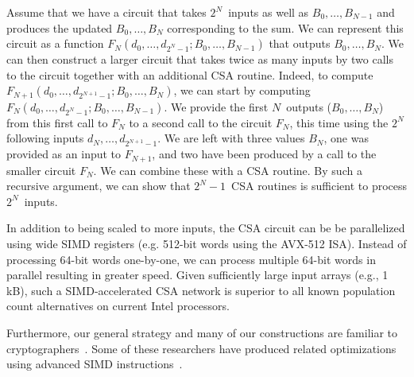 \documentclass[AMA,STIX1COL]{WileyNJD-v2}
\begin{document}
Assume that we have a circuit that takes $2^N$~inputs as well as  $B_0, \ldots, B_{N-1}$ and produces the updated $B_0, \ldots, B_{N}$ corresponding to the sum. We can represent this circuit as a function $F_N (d_0, \ldots, d_{2^N-1}; B_0, \ldots, B_{N-1})$ that outputs  $B_0, \ldots, B_{N}$. We can then construct a larger circuit that takes twice as many inputs by two calls to the circuit together with an additional CSA routine. Indeed, to compute $F_{N+1} (d_0, \ldots, d_{2^{N+1}-1}; B_0, \ldots, B_{N})$, we can start by computing $F_N (d_0, \ldots, d_{2^N-1}; B_0, \ldots, B_{N-1})$. We provide the first $N$~outputs ($B_0, \ldots, B_{N}$) from this first call to $F_N$ to a second call to the circuit $F_N$, this time using the $2^N$ following inputs $d_N, \ldots, d_{2^{N+1}-1}$. We are left with three values $B_N$, one was provided as an input to $F_{N+1}$, and two have been produced by a call to the smaller circuit $F_N$. We can combine these with a CSA routine. By such a recursive argument, we can show that $2^N-1$~CSA routines is sufficient to process $2^N$~inputs.


In addition to being scaled to more inputs, the CSA circuit can be be parallelized using wide SIMD registers (e.g. 512-bit words using the AVX-512 ISA). Instead of processing 64-bit words one-by-one, we can process multiple 64-bit words in parallel resulting in greater speed. Given sufficiently large input arrays (e.g., 1\,kB), such a SIMD-accelerated CSA network is superior to all known population count alternatives on current Intel processors\cite{mula2017faster}. 

Furthermore, our general strategy and many of our constructions are familiar to cryptographers~\cite{chou2016qcbits}. Some of these researchers have produced related optimizations using advanced SIMD instructions~\cite{guimaraes2019optimized,drucker2020qc}.
\end{document}
